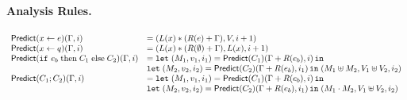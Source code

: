 \documentclass[a4paper,11pt]{article}
\begin{document}
\paragraph{Analysis Rules.}
\[\begin{array}{ll}
    \mathsf{Predict}( \mathrel{ x \leftarrow e } )( \Gamma , i )  & =  ( L(x) * ( R(e)
                                                  + \Gamma ), V, i+1 )\\
    \mathsf{Predict}( \mathrel{ x \leftarrow q })( \Gamma ,  i )  & = ( L(x) * ( R(\emptyset)
                                              + \Gamma) , L(x) , i+1 )\\
    \mathsf{Predict}( \mathtt{if} ~ e_b \mbox{\;then\;} C_1 \mbox{\;else\;} C_2 )( \Gamma , i )
                                                       & =   \mathop{\mathtt{let}} \;
                                                         (M_1, v_1, i_1) = 
                                                         \mathsf{Predict}(C_1)
                                                          (\Gamma
                                                         +R(e_b) , i)
                                                         \mathop{ \mathtt{in}} \;
    \\
    & 
                                                         \mathop{\mathtt{let}} \;
                                                         (M_2, v_2, i_2) = 
                                                         \mathsf{Predict}(C_2)
                                                          (\Gamma
                                                         +R(e_b) ,
                                                         i_1) \mathop{ \mathtt{in}} \;
                                                         (  M_1 \uplus M_2, V_1 \uplus V_2   , i_2 )
    \\
    \mathsf{Predict}( C_1 ; C_2 )( \Gamma ,  i )  & =  \mathop{\mathtt{let}} \;
                                                         (M_1, v_1, i_1) = 
                                                         \mathsf{Predict}(C_1)
                                                          (\Gamma
                                                         +R(e_b) , i)
                                                         \mathop{ \mathtt{in}} \;
    \\
    & 
                                                         \mathop{\mathtt{let}} \;
                                                         (M_2, v_2, i_2) = 
                                                         \mathsf{Predict}(C_2)
                                                          (\Gamma
                                                         +R(e_b) ,
                                                         i_1) \mathop{ \mathtt{in}} \;
                                                         (  M_1 \cdot M_2, V_1 \uplus V_2   , i_2 )      
    \end{array}
\]
    
\end{document}
